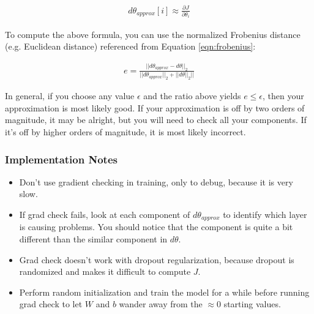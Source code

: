 \documentclass{article}
\begin{document}
\begin{align}
d\theta_{approx}[i] \approx \frac{\partial{J}}{\partial{\theta_i}}
\end{align}

To compute the above formula, you can use the normalized Frobenius distance (e.g. Euclidean distance) referenced from Equation \ref{eqn:frobenius}:

\begin{align}
e = \frac{||d\theta_{approx} - d\theta||_2}{||d\theta_{approx}||_2 + ||d\theta||_2||}
\end{align}

In general, if you choose any value $\epsilon$ and the ratio above yields $e \leq \epsilon$, then your approximation is most likely good.  If your approximation is off by two orders of magnitude, it may be alright, but you will need to check all your components.  If it's off by higher orders of magnitude, it is most likely incorrect.

\subsubsection{Implementation Notes}

\begin{itemize}
\item Don't use gradient checking in training, only to debug, because it is very slow.
\item If grad check fails, look at each component of $d\theta_{approx}$ to identify which layer is causing problems.  You should notice that the component is quite a bit different than the similar component in $d\theta$.
\item Grad check doesn't work with dropout regularization, because dropout is randomized and makes it difficult to compute $J$.
\item Perform random initialization and train the model for a while before running grad check to let $W$ and $b$ wander away from the $\approx 0$ starting values.
\end{itemize}
\end{document}
